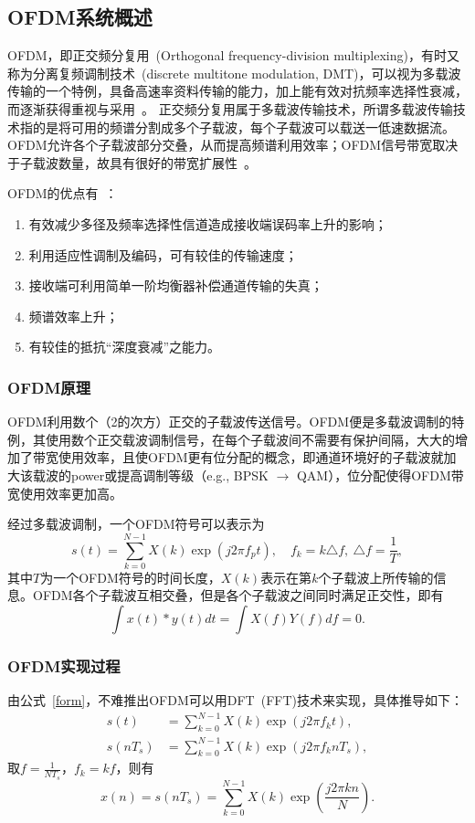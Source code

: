 \documentclass[a4paper,11pt,onecolumn,twoside]{article}
\begin{document}
\subsection{OFDM系统概述}
OFDM，即正交频分复用~(Orthogonal frequency-division multiplexing)，有时又称为分离复频调制技术~(discrete multitone modulation, DMT)，可以视为多载波传输的一个特例，具备高速率资料传输的能力，加上能有效对抗频率选择性衰减，而逐渐获得重视与采用~\supercite{wiki}。
正交频分复用属于多载波传输技术，所谓多载波传输技术指的是将可用的频谱分割成多个子载波，每个子载波可以载送一低速数据流。OFDM允许各个子载波部分交叠，从而提高频谱利用效率；OFDM信号带宽取决于子载波数量，故具有很好的带宽扩展性~\supercite{ta}。

OFDM的优点有~\supercite{wiki}：
\begin{enumerate}
\item 有效减少多径及频率选择性信道造成接收端误码率上升的影响；
\item 利用适应性调制及编码，可有较佳的传输速度；
\item 接收端可利用简单一阶均衡器补偿通道传输的失真；
\item 频谱效率上升；
\item 有较佳的抵抗``深度衰减''之能力。
\end{enumerate}

\subsubsection{OFDM原理}
OFDM利用数个（2的次方）正交的子载波传送信号。OFDM便是多载波调制的特例，其使用数个正交载波调制信号，在每个子载波间不需要有保护间隔，大大的增加了带宽使用效率，且使OFDM更有位分配的概念，即通道环境好的子载波就加大该载波的power或提高调制等级（e.g., BPSK $\rightarrow$ QAM），位分配使得OFDM带宽使用效率更加高。

经过多载波调制，一个OFDM符号可以表示为
\begin{equation}
s(t) = \sum_{k=0}^{N-1} X(k) \exp({j2\pi f_p t}), \quad f_k = k \triangle f ,\ \triangle f =\frac{1}{T},
\label{form}
\end{equation}
其中$T$为一个OFDM符号的时间长度，$X(k)$表示在第$k$个子载波上所传输的信息。OFDM各个子载波互相交叠，但是各个子载波之间同时满足正交性，即有
\begin{equation}
\int x(t)\ast y(t) dt = \int X(f)Y(f) df = 0.
\end{equation}

\subsubsection{OFDM实现过程}
由公式~\ref{form}，不难推出OFDM可以用DFT~(FFT)技术来实现，具体推导如下：
\begin{equation*}
\begin{split}
s(t) & = \sum_{k=0}^{N-1} X(k) \exp({j2\pi f_k t}), \\
s(nT_s) & = \sum_{k=0}^{N-1} X(k)\exp({j2\pi f_k nT_s}),
\end{split}
\end{equation*}
取$f = \frac{1}{NT_s}$，$f_k=kf$，则有
\begin{equation}
x(n) = s(nT_s) = \sum_{k=0}^{N-1} X(k)\exp(\frac{j2\pi k n}{N}).
\end{equation}
\end{document}
